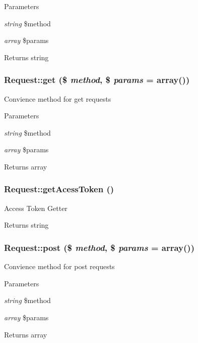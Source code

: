 \begin{DoxyParams}{Parameters}
\item[{\em string}]\$method \item[{\em array}]\$params\end{DoxyParams}
\begin{DoxyReturn}{Returns}
string 
\end{DoxyReturn}
\hypertarget{classRequest_a6a44d4bb9ea840bf3888f873d9c65b75}{
\subsubsection[{get}]{\setlength{\rightskip}{0pt plus 5cm}Request::get (\$ {\em method}, \/  \$ {\em params} = {\ttfamily array()})}}
\label{classRequest_a6a44d4bb9ea840bf3888f873d9c65b75}
Convience method for get requests 
\begin{DoxyParams}{Parameters}
\item[{\em string}]\$method \item[{\em array}]\$params\end{DoxyParams}
\begin{DoxyReturn}{Returns}
array 
\end{DoxyReturn}
\hypertarget{classRequest_ab35fed0193e981da0a80fb44d5788c77}{
\subsubsection[{getAcessToken}]{\setlength{\rightskip}{0pt plus 5cm}Request::getAcessToken ()}}
\label{classRequest_ab35fed0193e981da0a80fb44d5788c77}
Access Token Getter

\begin{DoxyReturn}{Returns}
string 
\end{DoxyReturn}
\hypertarget{classRequest_aa995830096c739f724e4823ada478b96}{
\subsubsection[{post}]{\setlength{\rightskip}{0pt plus 5cm}Request::post (\$ {\em method}, \/  \$ {\em params} = {\ttfamily array()})}}
\label{classRequest_aa995830096c739f724e4823ada478b96}
Convience method for post requests 
\begin{DoxyParams}{Parameters}
\item[{\em string}]\$method \item[{\em array}]\$params\end{DoxyParams}
\begin{DoxyReturn}{Returns}
array 
\end{DoxyReturn}


